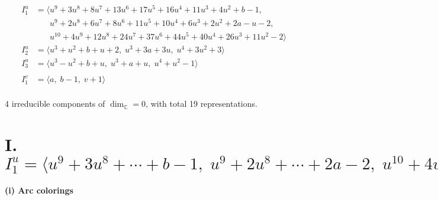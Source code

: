 \documentclass[1p]{elsarticle_modified}
\theoremstyle{definition}
\begin{document}
\begin{align*}
I^u_{1}&=\langle 
u^9+3 u^8+8 u^7+13 u^6+17 u^5+16 u^4+11 u^3+4 u^2+b-1,\\
\phantom{I^u_{1}}&\phantom{= \langle  }u^9+2 u^8+6 u^7+8 u^6+11 u^5+10 u^4+6 u^3+2 u^2+2 a- u-2,\\
\phantom{I^u_{1}}&\phantom{= \langle  }u^{10}+4 u^9+12 u^8+24 u^7+37 u^6+44 u^5+40 u^4+26 u^3+11 u^2-2\rangle \\
I^u_{2}&=\langle 
u^3+u^2+b+u+2,\;u^3+3 a+3 u,\;u^4+3 u^2+3\rangle \\
I^u_{3}&=\langle 
u^3- u^2+b+u,\;u^3+a+u,\;u^4+u^2-1\rangle \\
\\
I^v_{1}&=\langle 
a,\;b-1,\;v+1\rangle \\
\end{align*}
\raggedright * 4 irreducible components of $\dim_{\mathbb{C}}=0$, with total 19 representations.\\
\newpage
\renewcommand{\arraystretch}{1}
\centering \section*{I. $I^u_{1}= \langle u^9+3 u^8+\cdots+b-1,\;u^9+2 u^8+\cdots+2 a-2,\;u^{10}+4 u^9+\cdots+11 u^2-2 \rangle$}
\flushleft \textbf{(i) Arc colorings}\\
\end{document}
